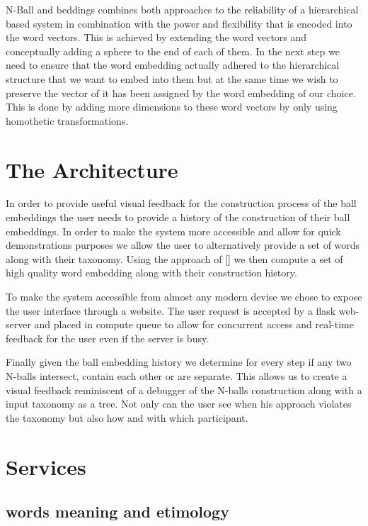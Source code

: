 \documentclass[]{article}
\begin{document}
N-Ball and beddings combines both approaches to the reliability of a hierarchical based system in combination with the power and flexibility that is encoded into the word vectors. This is achieved by extending the word vectors and conceptually adding a sphere to the end of each of them. In the next step we need to ensure that the word embedding actually adhered to the hierarchical structure that we want to embed into them but at the same time we wish to preserve the vector of it has been assigned by the word embedding of our choice. This is done by adding more dimensions to these word vectors by only using homothetic transformations.

\section{The Architecture}

In order to provide useful visual feedback for the construction process of the ball embeddings the user needs to provide a history of the construction of their ball embeddings. In order to make the system more accessible and allow for quick demonstrations purposes we allow the user to alternatively provide a set of words along with their taxonomy. Using the approach of [] we then compute a set of high quality word embedding along with their construction history.

To make the system accessible from almost any modern devise we chose to expose the user interface through a website. The user request is accepted by a flask web-server and placed in compute queue to allow for concurrent access and real-time feedback for the user even if the server is busy. 

Finally given the ball embedding history we determine for every step if any two N-balls intersect, contain each other or are separate. This allows us to create a visual feedback reminiscent of a debugger of the N-balls construction along with a input taxonomy as a tree. Not only can the user see when his approach violates the taxonomy but also how and with which participant.



\section{Services}

\subsection{words meaning and etimology}
\end{document}

